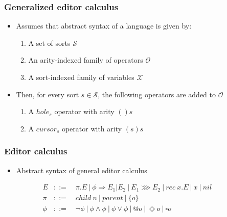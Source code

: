\documentclass[t,24pt,aspectratio=169]{beamer}
\begin{document}
\begin{frame}
    \frametitle{Generalized editor calculus}
    \begin{itemize}
        \item Assumes that abstract syntax of a language is given by:
              \begin{enumerate}
                  \item A set of sorts $\mathcal{S}$
                  \item An arity-indexed family of operators $\mathcal{O}$
                  \item A sort-indexed family of variables $\mathcal{X}$
              \end{enumerate}
        \item Then, for every sort $s \in \mathcal{S}$, the following operators are added to $\mathcal{O}$
              \begin{enumerate}
                  \item A $hole_s$ operator with arity $()s$
                  \item A $cursor_s$ operator with arity $(s)s$
              \end{enumerate}
    \end{itemize}
\end{frame}

\begin{frame}
    \frametitle{Editor calculus}
    \begin{itemize}
        \item Abstract syntax of general editor calculus
    \end{itemize}
    \vspace{1cm}
    \[
        \begin{aligned}
            E    & ::= \quad \pi.E \ | \ \phi \Rightarrow E_1|E_2 \ | \ E_1 \ggg E_2 \ | \ rec \ x.E \ | \ x \ | \ nil      &  & \\
            \pi  & ::= \quad child \ n \ | \ parent \ | \ \{ o \}                                                           &  & \\
            \phi & ::= \quad \neg \phi \ | \ \phi \land \phi \ | \ \phi \lor \phi \ | \ @o \ | \ \Diamond o \ | \ \square o
        \end{aligned}
    \]
\end{frame}
\end{document}
